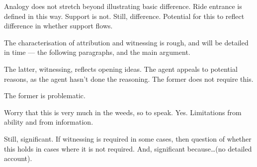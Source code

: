 \documentclass[10pt]{article}
\begin{document}
\begin{note}
  Analogy does not stretch beyond illustrating basic difference.
  Ride entrance is defined in this way.
  Support is not.
  Still, difference.
  Potential for this to reflect difference in whether support flows.

  The characterisation of attribution and witnessing is rough, and will be detailed in time --- the following paragraphs, and the main argument.

  The latter, witnessing, reflects opening ideas.
  The agent appeals to potential reasons, as the agent hasn't done the reasoning.
  The former does not require this.

  The former is problematic.
\end{note}

\begin{note}
  Worry that this is very much in the weeds, so to speak.
  Yes.
  Limitations from ability and from information.

  Still, significant.
  If witnessing is required in some cases, then question of whether this holds in cases where it is not required.
  And, significant because\dots (no detailed account).
\end{note}
\end{document}
